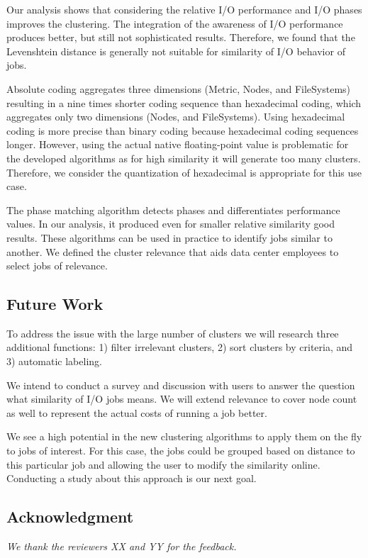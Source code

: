\documentclass{jhps}
\begin{document}
{{{{Our analysis shows that considering the relative I/O performance and I/O phases improves the clustering.
The integration of the awareness of I/O performance produces better, but still not sophisticated results.
Therefore, we found that the Levenshtein distance is generally not suitable for similarity of I/O behavior of jobs.

Absolute coding aggregates three dimensions (Metric, Nodes, and FileSystems) resulting in a nine times shorter coding sequence than hexadecimal coding, which aggregates only two dimensions (Nodes, and FileSystems).
Using hexadecimal coding is more precise than binary coding because hexadecimal coding sequences longer.
However, using the actual native floating-point value is problematic for the developed algorithms as for high similarity it will generate too many clusters.
Therefore, we consider the quantization of hexadecimal is appropriate for this use case.

The phase matching algorithm detects phases and differentiates performance values.
In our analysis, it produced even for smaller relative similarity good results.
These algorithms can be used in practice to identify jobs similar to another.
We defined the cluster relevance that aids data center employees to select jobs of relevance.


\subsection{Future Work}
To address the issue with the large number of clusters we will research three additional functions: 1) filter irrelevant clusters, 2) sort clusters by criteria, and 3) automatic labeling.

We intend to conduct a survey and discussion with users to answer the question what similarity of I/O jobs means.
We will extend relevance to cover node count as well to represent the actual costs of running a job better.

We see a high potential in the new clustering algorithms to apply them on the fly to jobs of interest.
For this case, the jobs could be grouped based on distance to this particular job and allowing the user to modify the similarity online.
Conducting a study about this approach is our next goal.


\subsection*{Acknowledgment} %
\textit{We thank the reviewers XX and YY for the feedback.}

}}}}
\end{document}
